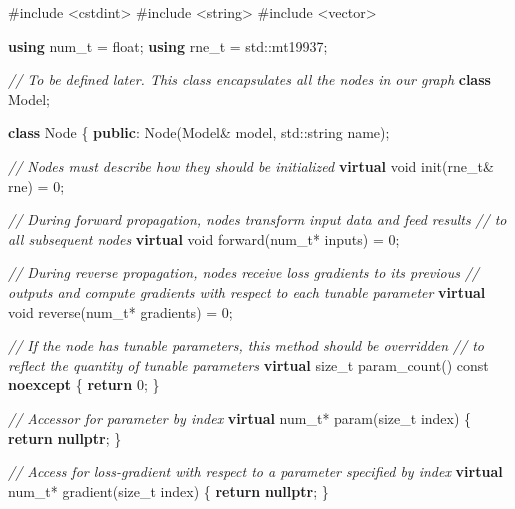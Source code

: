 \documentclass[
]{article}
\newenvironment{Shaded}{}{}
\newcommand{\AttributeTok}[1]{\textcolor[rgb]{0.49,0.56,0.16}{#1}}
\newcommand{\BuiltInTok}[1]{#1}
\newcommand{\CommentTok}[1]{\textcolor[rgb]{0.38,0.63,0.69}{\textit{#1}}}
\newcommand{\ControlFlowTok}[1]{\textcolor[rgb]{0.00,0.44,0.13}{\textbf{#1}}}
\newcommand{\DataTypeTok}[1]{\textcolor[rgb]{0.56,0.13,0.00}{#1}}
\newcommand{\DecValTok}[1]{\textcolor[rgb]{0.25,0.63,0.44}{#1}}
\newcommand{\ImportTok}[1]{#1}
\newcommand{\KeywordTok}[1]{\textcolor[rgb]{0.00,0.44,0.13}{\textbf{#1}}}
\newcommand{\NormalTok}[1]{#1}
\newcommand{\PreprocessorTok}[1]{\textcolor[rgb]{0.74,0.48,0.00}{#1}}
\begin{document}
\begin{Shaded}
\begin{Highlighting}[]
\PreprocessorTok{\#include }\ImportTok{\textless{}cstdint\textgreater{}}
\PreprocessorTok{\#include }\ImportTok{\textless{}string\textgreater{}}
\PreprocessorTok{\#include }\ImportTok{\textless{}vector\textgreater{}}

\KeywordTok{using} \DataTypeTok{num\_t}\NormalTok{ = }\DataTypeTok{float}\NormalTok{;}
\KeywordTok{using} \DataTypeTok{rne\_t}\NormalTok{ = }\BuiltInTok{std::}\NormalTok{mt19937;}

\CommentTok{// To be defined later. This class encapsulates all the nodes in our graph }
\KeywordTok{class}\NormalTok{ Model;}

\KeywordTok{class}\NormalTok{ Node}
\NormalTok{\{}
\KeywordTok{public}\NormalTok{:}
\NormalTok{    Node(Model\& model, }\BuiltInTok{std::}\NormalTok{string name);}
    
    \CommentTok{// Nodes must describe how they should be initialized}
    \KeywordTok{virtual} \DataTypeTok{void}\NormalTok{ init(}\DataTypeTok{rne\_t}\NormalTok{\& rne) = }\DecValTok{0}\NormalTok{;}
    
    \CommentTok{// During forward propagation, nodes transform input data and feed results}
    \CommentTok{// to all subsequent nodes}
    \KeywordTok{virtual} \DataTypeTok{void}\NormalTok{ forward(}\DataTypeTok{num\_t}\NormalTok{* inputs) = }\DecValTok{0}\NormalTok{;}

    \CommentTok{// During reverse propagation, nodes receive loss gradients to its previous}
    \CommentTok{// outputs and compute gradients with respect to each tunable parameter}
    \KeywordTok{virtual} \DataTypeTok{void}\NormalTok{ reverse(}\DataTypeTok{num\_t}\NormalTok{* gradients) = }\DecValTok{0}\NormalTok{;}
    
    \CommentTok{// If the node has tunable parameters, this method should be overridden}
    \CommentTok{// to reflect the quantity of tunable parameters}
    \KeywordTok{virtual} \DataTypeTok{size\_t}\NormalTok{ param\_count() }\AttributeTok{const} \KeywordTok{noexcept}\NormalTok{ \{ }\ControlFlowTok{return} \DecValTok{0}\NormalTok{; \}}
    
    \CommentTok{// Accessor for parameter by index}
    \KeywordTok{virtual} \DataTypeTok{num\_t}\NormalTok{* param(}\DataTypeTok{size\_t}\NormalTok{ index) \{ }\ControlFlowTok{return} \KeywordTok{nullptr}\NormalTok{; \}}
    
    \CommentTok{// Access for loss{-}gradient with respect to a parameter specified by index}
    \KeywordTok{virtual} \DataTypeTok{num\_t}\NormalTok{* gradient(}\DataTypeTok{size\_t}\NormalTok{ index) \{ }\ControlFlowTok{return} \KeywordTok{nullptr}\NormalTok{; \}}
    

\end{Highlighting}
\end{Shaded}
\end{document}
